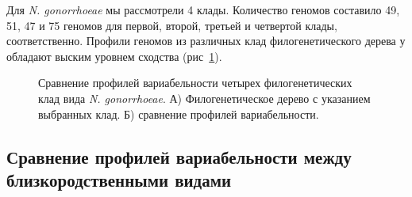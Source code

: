 Для \textit{N. gonorrhoeae} мы рассмотрели 4 клады. Количество геномов составило 49, 51, 47 и 75 геномов для первой, второй, третьей и четвертой клады, соответственно. Профили геномов из различных клад филогенетического дерева у обладают выским уровнем сходства (рис~\ref{img:ghono_complex}).

\begin{figure}[!ht] 
  \center
  \caption{Сравнение профилей вариабельности четырех филогенетических клад вида \textit{N. gonorrhoeae}. А) Филогенетическое дерево с указанием выбранных клад. Б) сравнение профилей вариабельности.}
  \label{img:ghono_complex} 
\end{figure}

\subsection{Сравнение профилей вариабельности между близкородственными видами}

